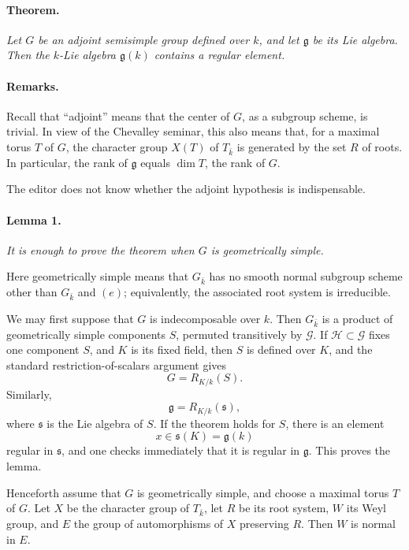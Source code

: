 \paragraph{\textbf{Theorem.}}
{\itshape Let \(G\) be an adjoint semisimple group defined over
\(k\), and let \(\mathfrak g\) be its Lie algebra. Then the
\(k\)-Lie algebra \(\mathfrak g(k)\) contains a regular element.}

\paragraph{\textbf{Remarks.}}
\textup{} Recall that ``adjoint'' means that the center of
\(G\), as a subgroup scheme, is trivial. In view of the Chevalley
seminar, this also means that, for a maximal torus \(T\) of
\(G\), the character group \(X(T)\) of \(T_{\bar k}\) is
generated by the set \(R\) of roots. In particular, the rank of
\(\mathfrak g\) equals \(\dim T\), the rank of \(G\).

\textup{} The editor does not know whether the adjoint
hypothesis is indispensable.

\paragraph{\textbf{Lemma 1.}}
{\itshape It is enough to prove the theorem when \(G\) is
geometrically simple.}

Here geometrically simple means that \(G_{\bar k}\) has no smooth
normal subgroup scheme other than \(G_{\bar k}\) and \((e)\);
equivalently, the associated root system is irreducible.

We may first suppose that \(G\) is indecomposable over \(k\).
Then \(G_{\bar k}\) is a product of geometrically simple
components \(S\), permuted transitively by \(\mathcal G\). If
\(\mathcal H\subset\mathcal G\) fixes one component \(S\), and
\(K\) is its fixed field, then \(S\) is defined over \(K\), and
the standard restriction-of-scalars argument gives
\[
  G=R_{K/k}(S).
\]
Similarly,
\[
  \mathfrak g=R_{K/k}(\mathfrak s),
\]
where \(\mathfrak s\) is the Lie algebra of \(S\). If the theorem
holds for \(S\), there is an element
\[
  x\in\mathfrak s(K)=\mathfrak g(k)
\]
regular in \(\mathfrak s\), and one checks immediately that it
is regular in \(\mathfrak g\). This proves the lemma.

Henceforth assume that \(G\) is geometrically simple, and choose
a maximal torus \(T\) of \(G\). Let \(X\) be the character group
of \(T_{\bar k}\), let \(R\) be its root system, \(W\) its Weyl
group, and \(E\) the group of automorphisms of \(X\) preserving
\(R\). Then \(W\) is normal in \(E\).

